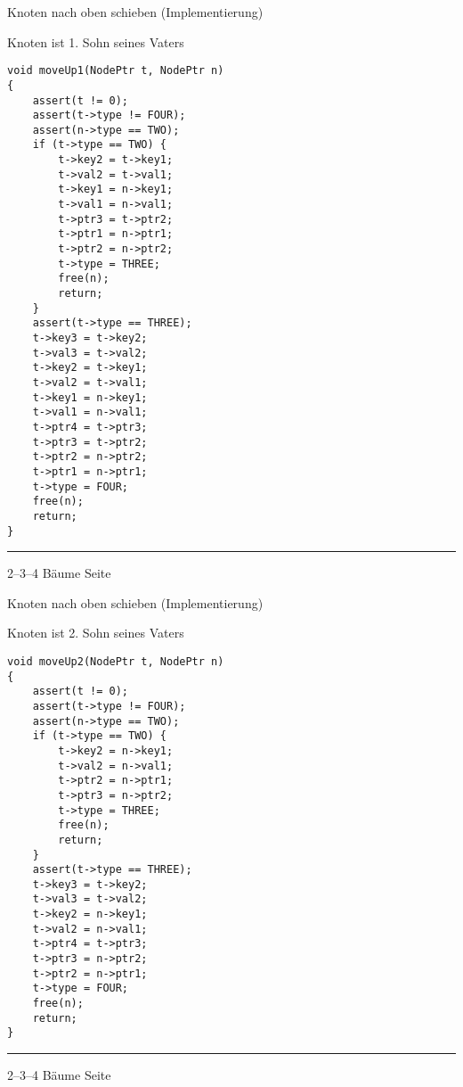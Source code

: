 \begin{slide}{}
\normalsize

\begin{center}
Knoten nach oben schieben (Implementierung)
\end{center}
\vspace*{0.5cm}

\footnotesize
Knoten ist 1. Sohn seines Vaters
\begin{verbatim}
void moveUp1(NodePtr t, NodePtr n) 
{
    assert(t != 0);
    assert(t->type != FOUR);
    assert(n->type == TWO);
    if (t->type == TWO) {
        t->key2 = t->key1;
        t->val2 = t->val1;
        t->key1 = n->key1;
        t->val1 = n->val1;
        t->ptr3 = t->ptr2;
        t->ptr1 = n->ptr1;
        t->ptr2 = n->ptr2;
        t->type = THREE;
        free(n);
        return;
    } 
    assert(t->type == THREE);
    t->key3 = t->key2;
    t->val3 = t->val2;
    t->key2 = t->key1;
    t->val2 = t->val1;
    t->key1 = n->key1;
    t->val1 = n->val1;
    t->ptr4 = t->ptr3;
    t->ptr3 = t->ptr2;
    t->ptr2 = n->ptr2;
    t->ptr1 = n->ptr1;
    t->type = FOUR;
    free(n);
    return;
}
\end{verbatim}

\vspace*{\fill}
\tiny \addtocounter{mypage}{1}
\rule{17cm}{1mm}
2--3--4 B\"aume  \hspace*{\fill} Seite 
\end{slide}


\begin{slide}{}
\normalsize

\begin{center}
Knoten nach oben schieben (Implementierung)
\end{center}
\vspace*{0.5cm}

\footnotesize
Knoten ist 2. Sohn seines Vaters
\begin{verbatim}
void moveUp2(NodePtr t, NodePtr n) 
{
    assert(t != 0);
    assert(t->type != FOUR);
    assert(n->type == TWO);
    if (t->type == TWO) {
        t->key2 = n->key1;
        t->val2 = n->val1;
        t->ptr2 = n->ptr1;
        t->ptr3 = n->ptr2;
        t->type = THREE;
        free(n);
        return;
    } 
    assert(t->type == THREE);
    t->key3 = t->key2;
    t->val3 = t->val2;
    t->key2 = n->key1;
    t->val2 = n->val1;
    t->ptr4 = t->ptr3;
    t->ptr3 = n->ptr2;
    t->ptr2 = n->ptr1;
    t->type = FOUR;
    free(n);
    return;
}
\end{verbatim}

\vspace*{\fill}
\tiny \addtocounter{mypage}{1}
\rule{17cm}{1mm}
2--3--4 B\"aume  \hspace*{\fill} Seite 
\end{slide}

